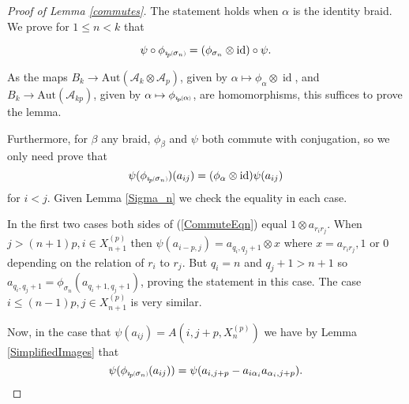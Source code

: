 \documentclass[11pt]{amsart}
\def\A{{\mathcal A}}
\def\s{{\sigma}}
\def\a{\alpha}
\newcommand*{\subsmallp}[1]{\scalebox{.5}{\ensuremath#1}}
\newcommand{\subpp}[2][p]{\imath_{\hspace*{-1pt}#1}\hspace*{-.5pt}\subsmallp(#2\subsmallp)}
\newcommand\id{\operatorname{id}}
\theoremstyle{definition}
\newtheorem{rem}[thm]{Remark}
\begin{document}
\begin{proof} [Proof of Lemma \ref{commutes}]
The statement holds when $\alpha$ is the identity braid. We prove for $1\le n < k$ that

$$\psi\circ\phi_{\subpp{\s_n}} = \left(\phi_{\s_n}\otimes \id\right)\circ\psi.$$

As the maps $B_{k} \to \text{Aut}(\A_k\otimes\A_p)$, given by $\alpha \mapsto \phi_\alpha\otimes\id$, and $B_k \to \text{Aut}(\A_{kp})$, given by $\alpha \mapsto \phi_{\subpp\alpha}$, are homomorphisms, this suffices to prove the lemma. %

Furthermore, for $\beta$ any braid, $\phi_\beta$ and $\psi$ both commute with conjugation, so we only need prove that 
      \begin{equation}\label{CommuteEqn}
      \psi(\phi_{\subpp{\s_n}})(a_{ij})=(\phi_\alpha\otimes\id)\psi(a_{ij})
      \end{equation}
for $i<j$. Given Lemma \ref{Sigma_n} we check the equality in each case. 

In the first two cases both sides of (\ref{CommuteEqn}) equal $1\otimes a_{r_ir_j}$. When $j>(n+1)p, i\in X_{n+1}^{(p)}$ then $\psi(a_{i-p,j}) = a_{q_i,q_j+1}\otimes x$ where $x=a_{r_ir_j}, 1$ or $0$ depending on the relation of $r_i$ to $r_j$. But $q_i=n$ and $q_j+1>n+1$ so $a_{q_i,q_j+1}=\phi_{\s_n}(a_{q_i+1,q_j+1})$, proving the statement in this case. The case $i\le (n-1)p,j\in X_{n+1}^{(p)}$ is very similar.

Now, in the case that $\psi(a_{ij}) = A(i,j+p,X_n^{(p)})$ we have by Lemma \ref{SimplifiedImages} that
$$\psi(\phi_{\subpp{\s_n}}(a_{ij})) = \psi(a_{i,j+p}-a_{i\a_i}a_{\a_i,j+p}).$$



\end{proof}
\end{document}
